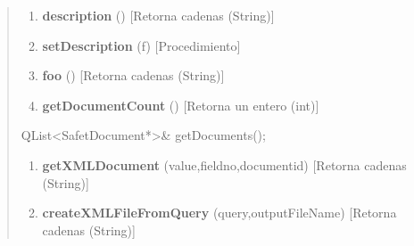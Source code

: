 \documentclass[letterpaper,11pt,spanish]{sphinxmanual}
\begin{document}
\begin{quote}
\begin{enumerate}
\item {} 
\textbf{description} () {[}Retorna cadenas (String){]}

\item {} 
\textbf{setDescription} (f) {[}Procedimiento{]}

\item {} 
\textbf{foo} () {[}Retorna cadenas (String){]}

\item {} 
\textbf{getDocumentCount} () {[}Retorna un entero (int){]}

\end{enumerate}

QList\textless{}SafetDocument*\textgreater{}\& getDocuments();
\begin{enumerate}
\item {} 
\textbf{getXMLDocument} (value,fieldno,documentid) {[}Retorna cadenas (String){]}

\item {} 
\textbf{createXMLFileFromQuery} (query,outputFileName) {[}Retorna cadenas (String){]}

\end{enumerate}
\end{quote}
\end{document}
